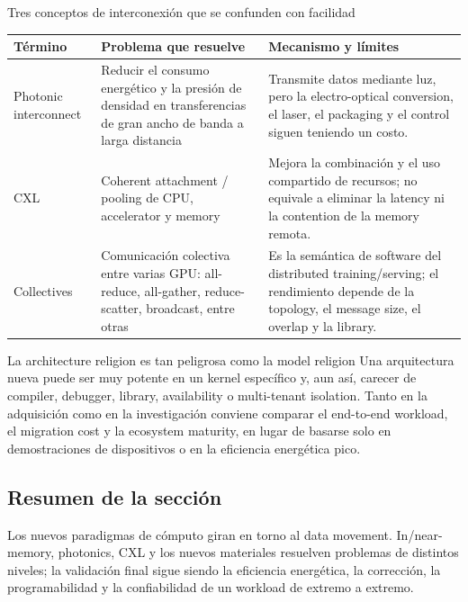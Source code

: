 \begin{knowledgebox}{Tres conceptos de interconexión que se confunden con facilidad}
\begin{tabularx}{\textwidth}{L{0.19\textwidth}L{0.25\textwidth}X}
\toprule
Término & Problema que resuelve & Mecanismo y límites \\
\midrule
Photonic interconnect & Reducir el consumo energético y la presión de densidad en transferencias de gran ancho de banda a larga distancia & Transmite datos mediante luz, pero la electro-optical conversion, el laser, el packaging y el control siguen teniendo un costo. \\
CXL & Coherent attachment / pooling de CPU, accelerator y memory & Mejora la combinación y el uso compartido de recursos; no equivale a eliminar la latency ni la contention de la memory remota. \\
Collectives & Comunicación colectiva entre varias GPU: all-reduce, all-gather, reduce-scatter, broadcast, entre otras & Es la semántica de software del distributed training/serving; el rendimiento depende de la topology, el message size, el overlap y la library. \\
\bottomrule
\end{tabularx}
\end{knowledgebox}

\begin{warningbox}{La architecture religion es tan peligrosa como la model religion}
Una arquitectura nueva puede ser muy potente en un kernel específico y, aun así, carecer de compiler, debugger, library, availability o multi-tenant isolation. Tanto en la adquisición como en la investigación conviene comparar el end-to-end workload, el migration cost y la ecosystem maturity, en lugar de basarse solo en demostraciones de dispositivos o en la eficiencia energética pico.
\end{warningbox}


\subsection{Resumen de la sección}

Los nuevos paradigmas de cómputo giran en torno al data movement. In/near-memory, photonics, CXL y los nuevos materiales resuelven problemas de distintos niveles; la validación final sigue siendo la eficiencia energética, la corrección, la programabilidad y la confiabilidad de un workload de extremo a extremo.
